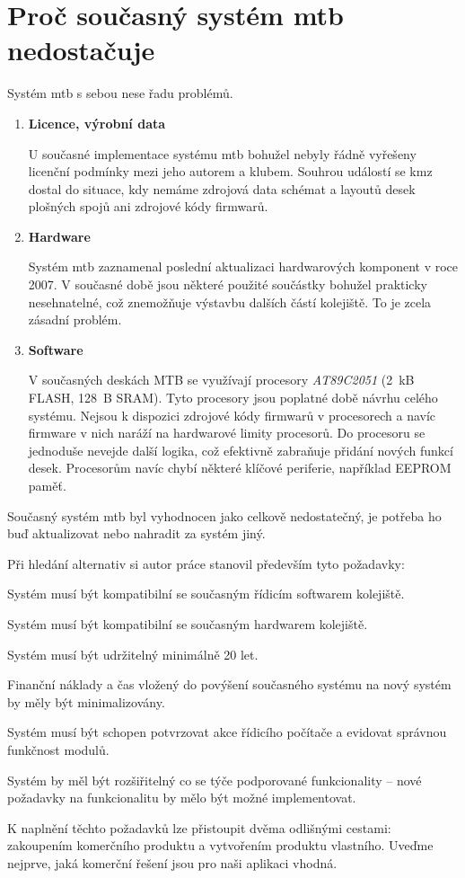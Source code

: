 \section{Proč současný systém \gls{mtb} nedostačuje} \label{sec:mtb_fail}

Systém \gls{mtb} s sebou nese řadu problémů.

\begin{enumerate}
\item \textbf{Licence, výrobní data}

U současné implementace systému \gls{mtb} bohužel nebyly řádně vyřešeny licenční
podmínky mezi jeho autorem a klubem. Souhrou událostí se \gls{kmz} dostal do
situace, kdy nemáme zdrojová data schémat a layoutů desek plošných spojů ani
zdrojové kódy firmwarů.

\item \textbf{Hardware}

Systém \gls{mtb} zaznamenal poslední aktualizaci hardwarových komponent v roce
2007. V současné době jsou některé použité součástky bohužel prakticky
nesehnatelné, což znemožňuje výstavbu dalších částí kolejiště. To je zcela
zásadní problém.

\item \textbf{Software}

V současných deskách MTB se využívají procesory \textit{AT89C2051} (2~kB FLASH,
128~B SRAM). Tyto procesory jsou poplatné době návrhu celého systému. Nejsou
k dispozici zdrojové kódy firmwarů v procesorech a navíc firmware v nich
naráží na hardwarové limity procesorů. Do procesoru se jednoduše nevejde další
logika, což efektivně zabraňuje přidání nových funkcí desek. Procesorům navíc
chybí některé klíčové periferie, například EEPROM paměť.

\end{enumerate}

Současný systém \gls{mtb} byl vyhodnocen jako celkově nedostatečný, je potřeba
ho buď aktualizovat nebo nahradit za systém jiný.

Při hledání alternativ si autor práce stanovil především tyto požadavky:

\begin{compactenum}
\item Systém musí být kompatibilní se současným řídicím softwarem kolejiště.
\item Systém musí být kompatibilní se současným hardwarem kolejiště.
\item Systém musí být udržitelný minimálně 20 let.
\item Finanční náklady a čas vložený do povýšení současného systému na nový
	systém by měly být minimalizovány.
\item Systém musí být schopen potvrzovat akce řídicího počítače a evidovat správnou
	funkčnost modulů.
\item Systém by měl být rozšiřitelný co se týče podporované funkcionality –
	nové požadavky na funkcionalitu by mělo být možné implementovat.
\end{compactenum}

K naplnění těchto požadavků lze přistoupit dvěma odlišnými cestami: zakoupením
komerčního produktu a vytvořením produktu vlastního. Uveďme nejprve, jaká komerční
řešení jsou pro naši aplikaci vhodná.
